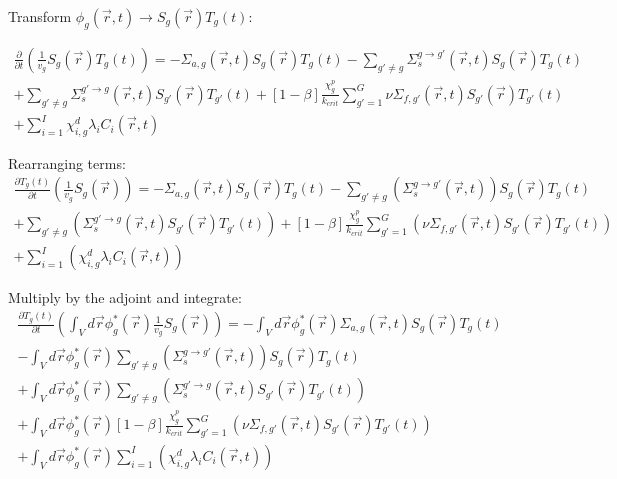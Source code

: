 \documentclass[12pt]{report}
\begin{document}
	Transform $\phi_g(\vec{r},t) \rightarrow S_g(\vec{r}) T_g(t)$:
	
		\begin{eqnarray}
		\frac{\partial}{\partial t} \left( \frac{1}{v_g}  S_g(\vec{r}) T_g(t) \right) = - \Sigma_{a,g}(\vec{r},t)  S_g(\vec{r}) T_g(t) - \sum_{g' \neq g} \Sigma_{s}^{g\rightarrow g'} (\vec{r},t)  S_g(\vec{r}) T_g(t) \nonumber \\  + \sum_{g' \neq g} \Sigma_{s}^{g'\rightarrow g} (\vec{r},t)  S_{g'}(\vec{r}) T_{g'}(t) 	+ \left[ 1- \beta \right] \frac{\chi_g^p}{k_{crit}} \sum_{g'=1}^{G} \nu \Sigma_{f,g'}(\vec{r},t) S_{g'}(\vec{r}) T_{g'}(t) \nonumber \\ +
		 \sum_{i=1}^{I} \chi_{i,g}^d \lambda_i C_i(\vec{r},t)
		\end{eqnarray}
		
	Rearranging terms:
	\begin{eqnarray} 
	\frac{\partial T_g(t)}{\partial t} \left( \frac{1}{v_g}  S_g(\vec{r}) \right) = - \Sigma_{a,g}(\vec{r},t)  S_g(\vec{r}) T_g(t) - \sum_{g'\neq g} \left( \Sigma_{s}^{g\rightarrow g'}(\vec{r},t) \right)  S_g(\vec{r}) T_g(t) \nonumber \\  + \sum_{g'\neq g} \left( \Sigma_{s}^{g'\rightarrow g} (\vec{r},t)  S_{g'}(\vec{r}) T_{g'}(t) \right) + \left[ 1- \beta \right] \frac{\chi_g^p}{k_{crit}} \sum_{g'=1}^{G} \left( \nu \Sigma_{f,g'}(\vec{r},t) S_{g'}(\vec{r}) T_{g'}(t) \right) \nonumber \\ +
	\sum_{i=1}^{I} \left( \chi_{i,g}^d \lambda_i C_i(\vec{r},t) \right)
	\end{eqnarray}
	
	Multiply by the adjoint and integrate:
	\begin{eqnarray} 
	\frac{\partial T_g(t)}{\partial t} \left( \int_{V} d\vec{r} \phi_g^*(\vec{r}) \frac{1}{v_g}  S_g(\vec{r}) \right) = - \int_{V} d\vec{r} \phi_g^*(\vec{r}) \Sigma_{a,g}(\vec{r},t)  S_g(\vec{r}) T_g(t) \nonumber \\
	- \int_{V} d\vec{r} \phi_g^*(\vec{r}) \sum_{g'\neq g} \left( \Sigma_{s}^{g\rightarrow g'}(\vec{r},t) \right)  S_g(\vec{r}) T_g(t) \nonumber \\
	  + \int_{V} d\vec{r} \phi_g^*(\vec{r}) \sum_{g'\neq g} \left( \Sigma_{s}^{g'\rightarrow g} (\vec{r},t)  S_{g'}(\vec{r}) T_{g'}(t) \right) \nonumber \\
	  + \int_{V} d\vec{r} \phi_g^*(\vec{r}) \left[ 1- \beta \right] \frac{\chi_g^p}{k_{crit}} \sum_{g'=1}^{G} \left( \nu \Sigma_{f,g'}(\vec{r},t) S_{g'}(\vec{r}) T_{g'}(t) \right) \nonumber \\ +
	\int_{V} d\vec{r} \phi_g^*(\vec{r}) \sum_{i=1}^{I} \left( \chi_{i,g}^d \lambda_i C_i(\vec{r},t) \right)
	\end{eqnarray}
	
\end{document}
